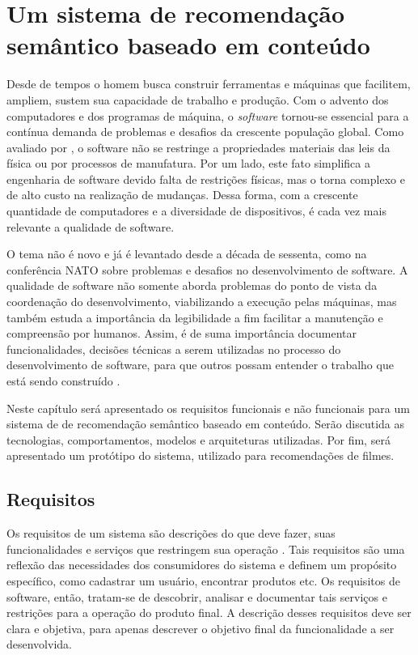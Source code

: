 \label{cap:proposal}
\chapter{Um sistema de recomendação semântico baseado em conteúdo}

Desde de tempos o homem busca construir ferramentas e máquinas que facilitem, ampliem, sustem sua capacidade de trabalho e produção. Com o advento dos computadores e dos programas de máquina, o \textit{software} tornou-se essencial para a contínua demanda de problemas e desafios da crescente população global. Como avaliado por \cite{Sommerville2010},  o software não se restringe a propriedades materiais das leis da física ou por processos de manufatura. Por um lado, este fato simplifica a engenharia de software devido falta de restrições físicas, mas o torna complexo e de alto custo na realização de mudanças. Dessa forma, com a crescente quantidade de computadores e a diversidade de dispositivos, é cada vez mais relevante a qualidade de software.

O tema não é novo e já é levantado desde a década de sessenta, como na conferência NATO \citep{NR68} sobre problemas e desafios no desenvolvimento de software. A qualidade de software não somente aborda problemas do ponto de vista da coordenação do desenvolvimento, viabilizando a execução pelas máquinas, mas também estuda a importância da legibilidade a fim facilitar a manutenção e compreensão por humanos. Assim, é de suma importância documentar funcionalidades, decisões técnicas a serem utilizadas no processo do desenvolvimento de software, para que outros possam entender o trabalho que está sendo construído \citep{Pressman2009}.

Neste capítulo será apresentado os requisitos funcionais e não funcionais para um sistema de de recomendação semântico baseado em conteúdo. Serão discutida as tecnologias, comportamentos, modelos e arquiteturas utilizadas. Por fim, será apresentado um protótipo do sistema, utilizado para recomendações de filmes.

\section{Requisitos}

Os requisitos de um sistema são descrições do que deve fazer, suas funcionalidades e serviços que restringem sua operação \citep{Sommerville2010}. Tais requisitos são uma reflexão das necessidades dos consumidores do sistema e definem um propósito específico, como cadastrar um usuário, encontrar produtos etc. Os requisitos de software, então, tratam-se de descobrir, analisar e documentar tais serviços e restrições para a operação do produto final. A descrição desses requisitos deve ser clara e objetiva, para apenas descrever o objetivo final da funcionalidade a ser desenvolvida.

